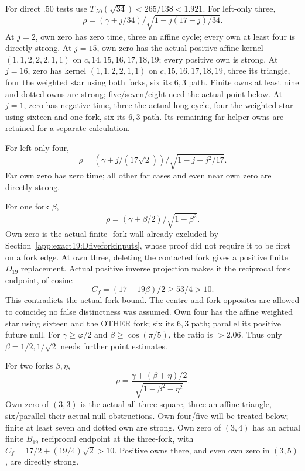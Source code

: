 \documentclass[11pt]{article}
\theoremstyle{definition}
\theoremstyle{remark}
\begin{document}
For direct \(.50\) tests use
\(T_{.50}(\sqrt{34})<265/138<1.921\).
For left-only three,
\[
          \rho=(\gamma+j/34)/
                          \sqrt{1-j(17-j)/34}.
\]
At \(j=2\), own zero has zero
time, three an affine cycle;
every own at least four is
directly strong.
At \(j=15\), own zero has the
actual positive affine kernel
\((1,1,2,2,2,1,1)\) on
\(c,14,15,16,17,18,19\);
every positive own is strong.
At \(j=16\), zero has kernel
\((1,1,2,2,1,1)\) on
\(c,15,16,17,18,19\), three
its triangle, four the weighted
star using both forks, six its
\(6,3\) path.
Finite owns at least nine and
dotted owns are strong;
five/seven/eight need the actual
point below.
At \(j=1\), zero has negative
time, three the actual long
cycle, four the weighted star
using sixteen and one fork,
six its \(6,3\) path.
Its remaining far-helper owns
are retained for a separate
calculation.

For left-only four,
\[
       \rho=(\gamma+j/(17\sqrt2))/
                               \sqrt{1-j+j^2/17}.
\]
Far own zero has zero time;
all other far cases and even
near own zero are directly
strong.

For one fork \(\beta\),
\[
                       \rho=(\gamma+\beta/2)/\sqrt{1-\beta^2}.
\]
Own zero is the actual finite-
fork wall already excluded by
Section~\ref{app:exact19:Dfiveforkinputs},
whose proof did not require it
to be first on a fork edge.
At own three, deleting the
contacted fork gives a positive
finite \(D_{19}\) replacement.
Actual positive inverse projection
makes it the reciprocal fork
endpoint, of cosine
\[
                            C_f=(17+19\beta)/2\ge53/4>10 .
\]
This contradicts the actual fork
bound.
The centre and fork opposites
are allowed to coincide; no
false distinctness was assumed.
Own four has the affine weighted
star using sixteen and the OTHER
fork; six its \(6,3\) path;
parallel its positive future
null.
For \(\gamma\ge\varphi/2\) and
\(\beta\ge\cos(\pi/5)\), the
ratio is \(>2.06\).
Thus only \(\beta=1/2,1/\sqrt2\)
needs further point estimates.

For two forks \(\beta,\eta\),
\[
             \rho=\frac{\gamma+(\beta+\eta)/2}
                                   {\sqrt{1-\beta^2-\eta^2}} .
\]
Own zero of \((3,3)\) is the
actual all-three square, three
an affine triangle, six/parallel
their actual null obstructions.
Own four/five will be treated
below; finite at least seven
and dotted own are strong.
Own zero of \((3,4)\) has an
actual finite \(B_{19}\)
reciprocal endpoint at the
three-fork, with
\(C_f=17/2+(19/4)\sqrt2>10\).
Positive owns there, and even
own zero in \((3,5)\), are
directly strong.
\end{document}
